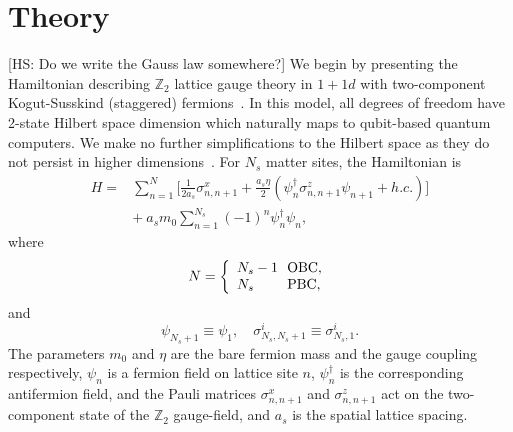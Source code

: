 \documentclass[twocolumn,superscriptaddress,showpacs,nofootinbib,notitlepage,preprintnumbers,secnumarabic,amssymb, floatfix, nobibnotes, aps, prd]{revtex4-2}
\newcommand\HS[1]{{\color{olive4}\smaller\textsf{[HS: #1]}}}
\begin{document}
\section{Theory}
\label{sec:theory}
\HS{Do we write the Gauss law somewhere?}
We begin by presenting the Hamiltonian describing $\mathbb{Z}_{2}$ lattice gauge theory in $1+1d$ with two-component Kogut-Susskind (staggered) fermions~\cite{PhysRevD.11.395,PhysRevD.13.1043}.
In this model, all degrees of freedom have 2-state Hilbert space dimension which naturally maps to qubit-based quantum computers. 
We make no further simplifications to the Hilbert space as they do not persist in higher dimensions~\cite{Zohar:2021nyc}.  
For $N_{s}$ matter sites, the Hamiltonian is
\begin{equation}
\begin{split}
    H =& \sum_{n=1}^{N}\bigg[ \frac{1}{2 a_s}\sigma^{x}_{n,n+1} + \frac{a_s \eta }{2}(\psi^{\dagger}_n\sigma_{n,n+1}^{z}\psi_{n+1} + h.c.)\bigg]\\
    & +\ a_s m_0 \sum_{n=1}^{N_s}  (-1) ^{n}\psi^{\dagger}_n\psi_n,
\end{split}
\end{equation}
where
\begin{equation}\label{eq:upper_limit}
    N = \left\{
    \begin{array}{l@{\,\,}l}
        N_{s} - 1 & \text{ OBC,} \\
        N_{s}     & \text{ PBC,}
    \end{array}
    \right.
\end{equation}
and 
\begin{equation}
    \psi_{N_{s}+1} \equiv \psi_{1},\quad \sigma^{i}_{N_{s}, N_{s}+1}\equiv \sigma^{i}_{N_{s},1}.
\end{equation}
The parameters $m_0$ and $\eta$ are the bare fermion mass and the gauge coupling respectively, $\psi_n$ is a fermion field on lattice site $n$, $\psi^{\dagger}_n$ is the corresponding antifermion field, and the Pauli matrices $\sigma_{n,n+1}^x$ and $\sigma_{n,n+1}^z$ act on the two-component state of the $\mathbb{Z}_2$ gauge-field, and $a_s$ is the spatial lattice spacing.   
\end{document}
